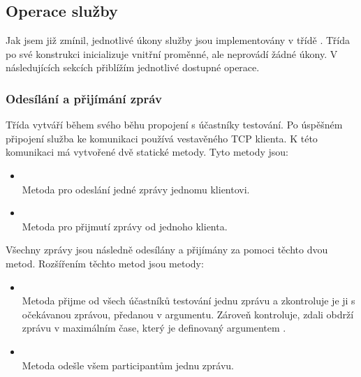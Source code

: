 \subsection{Operace služby}

Jak jsem již zmínil, jednotlivé úkony služby jsou implementovány v třídě . 
Třída po své konstrukci inicializuje vnitřní proměnné, ale neprovádí žádné úkony. V následujících sekcích přiblížím jednotlivé dostupné operace.

\subsubsection{Odesílání a přijímání zpráv}
Třída  vytváří během svého běhu propojení s účastníky testování. Po úspěšném připojení služba ke komunikaci používá vestavěného TCP klienta. K této komunikaci má vytvořené dvě statické metody. Tyto metody jsou:

\begin{itemize}
    \item {} \\
    Metoda pro odeslání jedné zprávy jednomu klientovi.
    \item {} \\
    Metoda pro přijmutí zprávy od jednoho klienta.
\end{itemize}

Všechny zprávy jsou následně odesílány a přijímány za pomoci těchto dvou metod. Rozšířením těchto metod jsou metody:

 {
    \setlength{\emergencystretch}{3em} 
    \begin{itemize}
        \item {} \\
        Metoda přijme od všech účastníků testování jednu zprávu a zkontroluje je ji s očekávanou zprávou, předanou v argumentu. Zároveň kontroluje, zdali obdrží zprávu v maximálním čase, který je definovaný argumentem . 
        \item {} \\
        Metoda odešle všem participantům jednu zprávu.
    \end{itemize}
 }

